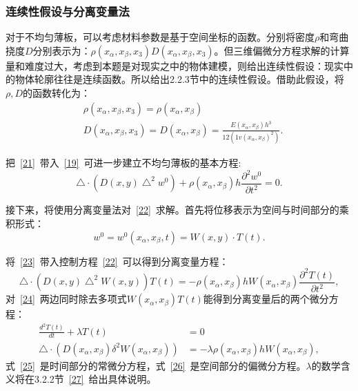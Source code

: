 \documentclass[withoutpreface,bwprint]{cumcmthesis} %
\begin{document}
\subsubsection{连续性假设与分离变量法}
对于不均匀薄板，可以考虑材料参数是基于空间坐标的函数。分别将密度$\rho$和弯曲挠度$D$分别表示为：$\rho\left(x_{\alpha},x_{\beta},x_3\right)D\left(x_{\alpha},x_{\beta},x_3\right)$。但三维偏微分方程求解的计算量和难度过大，考虑到本题是对现实之中的物体建模，则给出连续性假设：现实中的物体轮廓往往是连续函数。所以给出2.2.3节中的连续性假设。借助此假设，将$\rho,D$的函数转化为：
\begin{equation}
\begin{aligned}
&\rho\left(x_{\alpha},x_{\beta},x_3\right)=\rho\left(x_\alpha,x_\beta\right)\\&D\left(x_{\alpha},x_{\beta},x_3\right)=D\left(x_\alpha,x_\beta\right)=\frac{E\left(x_\alpha,x_\beta\right)h^3}{12\left(1v\left(x_\alpha,x_\beta\right)^2\right)}. 
    \end{aligned}
    \label{21}
\end{equation}

把~\eqref{21}~带入~\eqref{19}~可进一步建立不均匀薄板的基本方程:
\begin{equation}
\bigtriangleup\cdot\left(D\left(x,y\right)\bigtriangleup^2w^0\right)+\rho\left(x_\alpha,x_\beta\right)h\frac{\partial^2w^0}{\partial t^2}=0.
\label{22}\end{equation}

接下来，将使用分离变量法对~\eqref{22}~求解。首先将位移表示为空间与时间部分的乘积形式：
\begin{equation}
    w^0=w^0\left(x_\alpha,x_\beta,t\right)=W\left(x,y\right)\cdot T\left(t\right).\label{23}
\end{equation}

将~\eqref{23}~带入控制方程~\eqref{22}~可以得到分离变量方程：
\begin{equation}
    \bigtriangleup\cdot\left(D\left(x,y\right)\bigtriangleup^2W\left(x,y\right)\right)T\left(t\right)=-\rho\left(x_\alpha,x_\beta\right)hW\left(x_\alpha,x_\beta\right)\frac{\partial^2 T(t)}{\partial t^2},\label{24}
\end{equation}
对~\eqref{24}~两边同时除去多项式$W\left(x_{\alpha},x_{\beta}\right)T(t)$能得到分离变量后的两个微分方程：
\begin{align}
    \frac{d^2 T(t)}{dt}+\lambda T(t)&=0\label{25} \\
    \bigtriangleup\cdot\left(D\left(x_\alpha,x_\beta\right)\delta^2W\left(x_\alpha,x_\beta\right)\right)&=-\lambda\rho\left(x_{\alpha},x_{\beta}\right)hW\left(x_{\alpha},x_{\beta}\right),\label{26}
\end{align}
式~\eqref{25}~是时间部分的常微分方程，式~\eqref{26}~是空间部分的偏微分方程。$\lambda$的数学含义将在3.2.2节~\eqref{27}~给出具体说明。
\end{document}
